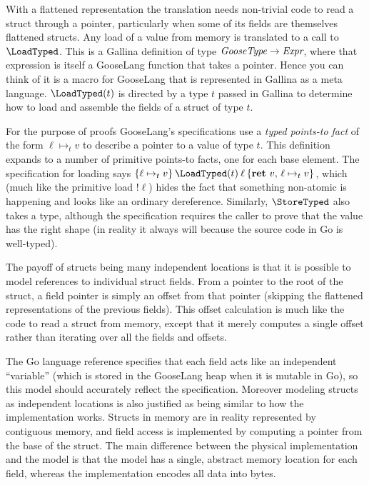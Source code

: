 With a flattened representation the translation needs non-trivial code to read a struct
through a pointer, particularly when some of its fields are themselves flattened
structs. Any load of a value from memory is translated to a call to
$\LoadTyped$. This is a Gallina definition of type
$\textit{GooseType} \to \textit{Expr}$, where that expression is itself a
GooseLang function that takes a pointer. Hence you can think of it is a macro
for GooseLang that is represented in Gallina as a meta language. $\LoadTyped(t)$
is directed by a type $t$ passed in Gallina to determine how to load and
assemble the fields of a struct of type $t$.

For the purpose of proofs GooseLang's specifications use a \emph{typed points-to fact}
of the form $\ell \mapsto_t v$ to describe a pointer to a value of type $t$. This
definition expands to a number of primitive points-to facts, one for
each base element. The specification for loading says
$\hoare{\ell \mapsto_t v}{\LoadTyped(t) \app \ell}{\Ret{v} \ell \mapsto_t v}$, which
(much like the primitive load $!\ell$) hides the fact that something
non-atomic is happening and looks like an ordinary dereference.
Similarly, $\StoreTyped$ also takes a type, although the specification
requires the caller to prove that the value has the right shape (in
reality it always will because the source code in Go is well-typed).

The payoff of structs being many independent locations is that it is
possible to model references to individual struct fields. From a pointer
to the root of the struct, a field pointer is simply an offset from that
pointer (skipping the flattened representations of the previous fields).
This offset calculation is much like the code to read a struct from
memory, except that it merely computes a single offset rather than
iterating over all the fields and offsets.

The Go language reference specifies that each field acts like an
independent ``variable'' (which is stored in the GooseLang heap when it
is mutable in Go), so this model should accurately reflect the
specification. Moreover modeling structs as independent locations is
also justified as being similar to how the implementation works. Structs
in memory are in reality represented by contiguous memory, and field
access is implemented by computing a pointer from the base of the
struct. The main difference between the physical implementation and the
model is that the model has a single, abstract memory location for each field,
whereas the implementation encodes all data into bytes.

